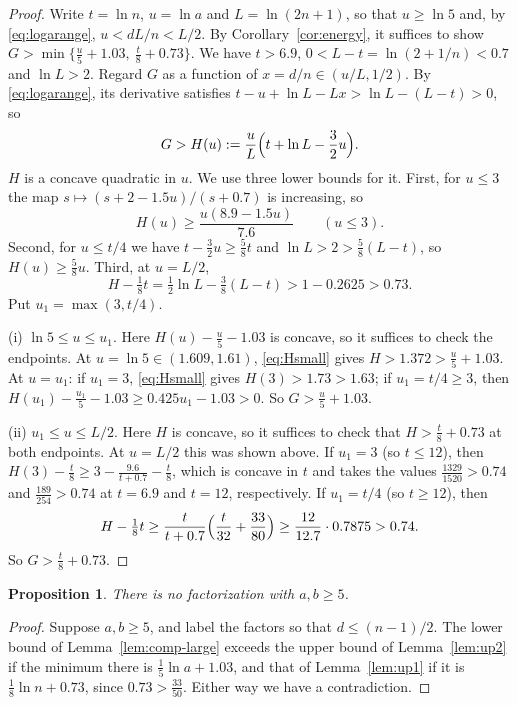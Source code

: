\documentclass[11pt]{amsart}
\newtheorem{proposition}[theorem]{Proposition}
\theoremstyle{definition}
\theoremstyle{remark}
\numberwithin{equation}{section}
\begin{document}
\begin{proof}
Write $t=\ln n$, $u=\ln a$ and $L=\ln(2n+1)$, so that $u\ge\ln5$ and, by
\eqref{eq:logarange}, $u<dL/n<L/2$. By Corollary~\ref{cor:energy}, it
suffices to show $G>\min\{\frac u5+1.03,\ \frac t8+0.73\}$. We have $t>6.9$,
$0<L-t=\ln(2+1/n)<0.7$ and $\ln L>2$. Regard $G$ as a function of
$x=d/n\in(u/L,1/2)$. By \eqref{eq:logarange}, its derivative satisfies
$t-u+\ln L-Lx>\ln L-(L-t)>0$, so
\[
 G>H(u):=\frac uL\Bigl(t+\ln L-\frac32u\Bigr).
\]
$H$ is a concave quadratic in $u$. We use three lower bounds for it. First,
for $u\le3$ the map $s\mapsto(s+2-1.5u)/(s+0.7)$ is increasing, so
\begin{equation}\label{eq:Hsmall}
 H(u)\ge\frac{u(8.9-1.5u)}{7.6}\qquad(u\le3).
\end{equation}
Second, for $u\le t/4$ we have $t-\frac32u\ge\frac58t$ and
$\ln L>2>\frac58(L-t)$, so $H(u)\ge\frac58u$. Third, at $u=L/2$,
\[
 H-\tfrac18t=\tfrac12\ln L-\tfrac38(L-t)>1-0.2625>0.73 .
\]
Put $u_1=\max(3,t/4)$.

(i) $\ln5\le u\le u_1$. Here $H(u)-\frac u5-1.03$ is concave, so it suffices
to check the endpoints. At $u=\ln5\in(1.609,1.61)$, \eqref{eq:Hsmall} gives
$H>1.372>\frac u5+1.03$. At $u=u_1$: if $u_1=3$, \eqref{eq:Hsmall} gives
$H(3)>1.73>1.63$; if $u_1=t/4\ge3$, then $H(u_1)-\frac{u_1}5-1.03\ge
0.425u_1-1.03>0$. So $G>\frac u5+1.03$.

(ii) $u_1\le u\le L/2$. Here $H$ is concave, so it suffices to check that
$H>\frac t8+0.73$ at both endpoints. At $u=L/2$ this was shown above. If
$u_1=3$ (so $t\le12$), then
$H(3)-\frac t8\ge3-\frac{9.6}{t+0.7}-\frac t8$, which is concave in $t$ and
takes the values $\frac{1329}{1520}>0.74$ and $\frac{189}{254}>0.74$
at $t=6.9$ and $t=12$, respectively. If $u_1=t/4$ (so $t\ge12$), then
\[
 H-\tfrac18t\ge\frac t{t+0.7}\Bigl(\frac t{32}+\frac{33}{80}\Bigr)
 \ge\frac{12}{12.7}\cdot0.7875>0.74 .
\]
So $G>\frac t8+0.73$.
\end{proof}

\begin{proposition}\label{prop:large}
There is no factorization with $a,b\ge5$.
\end{proposition}

\begin{proof}
Suppose $a,b\ge5$, and label the factors so that $d\le(n-1)/2$. The
lower bound of Lemma~\ref{lem:comp-large} exceeds the upper bound of
Lemma~\ref{lem:up2} if the minimum there is $\frac15\ln a+1.03$, and that
of Lemma~\ref{lem:up1} if it is $\frac18\ln n+0.73$, since
$0.73>\frac{33}{50}$. Either way we have a contradiction.
\end{proof}
\end{document}
